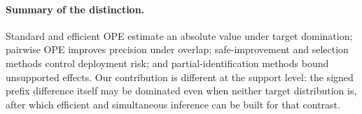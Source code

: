 \paragraph{Summary of the distinction.}
Standard and efficient OPE estimate an absolute value under target domination; pairwise OPE improves precision under overlap; safe-improvement and selection methods control deployment risk; and partial-identification methods bound unsupported effects. Our contribution is different at the support level: the signed prefix difference itself may be dominated even when neither target distribution is, after which efficient and simultaneous inference can be built for that contrast.
